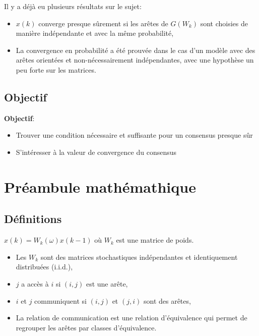 \documentclass{beamer}
\begin{document}
\begin{frame}
	Il y a déjà eu plusieurs résultats sur le sujet:
	\begin{itemize}
		\item $x(k)$ converge presque sûrement si les arêtes de $G(W_k)$ sont choisies de manière indépendante et avec la même probabilité,
		\pause
		\item La convergence en probabilité a été prouvée dans le cas d'un modèle avec des arêtes orientées et non-nécessairement indépendantes, avec une hypothèse un peu forte sur les matrices.
	\end{itemize}
\end{frame}

\subsection{Objectif}

\begin{frame}
	\textbf{Objectif}:
	\begin{itemize}
		\item Trouver une condition nécessaire et suffisante pour un consensus presque sûr
		\item S'intéresser à la valeur de convergence du consensus
	\end{itemize}
\end{frame}
		
\section{Préambule mathémathique}
\subsection{Définitions}
\begin{frame}
	$ x(k) = W_k(\omega)x(k-1)$ où $W_k$ est une matrice de poids.
	
	\begin{itemize}
		\item Les $W_k$ sont des matrices stochastiques indépendantes et identiquement distribuées (i.i.d.),
		\item $j$ a accès à $i$ si $(i,j)$ est une arête,
		\item $i$ et $j$ communiquent si $(i,j)$ et $(j,i)$ sont des arêtes,
		\item La relation de communication est une relation d'équivalence qui permet de regrouper les arêtes par classes d'équivalence.
	\end{itemize}
\end{frame}
\end{document}
